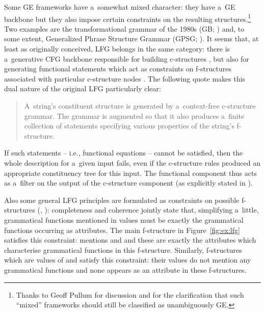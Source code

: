 \documentclass[output=paper,hidelinks]{langscibook}
\begin{document}
Some GE frameworks have a~somewhat mixed character: they have a~GE backbone but they also impose certain constraints on the resulting structures.\footnote{Thanks to Geoff Pullum for discussion and for the clarification that such “mixed” frameworks should still be classified as unambiguously GE\@.}  Two examples are the transformational grammar of the 1980s (GB; \citealt{chomsky1981lectures,Chomsky86b}) and, to some extent, Generalized Phrase Structure Grammar (GPSG; \citealt{gkps}).  It seems that, at least as originally conceived, LFG belongs in the same category: there is a~generative CFG backbone responsible for building c-structures \citep[175]{kaplanbresnan82}, but also for generating functional statements which act as constraints on f-structures associated with particular c-structure nodes \citep[181]{kaplanbresnan82}.  The following quote makes this dual nature of the original LFG particularly clear:
\begin{quote}
  A~string's constituent structure is generated by a~context-free c-structure grammar.  The grammar is augmented so that it also produces a~finite collection of statements specifying various properties of the string's f-structure. \\\hspace*{\fill}\citep[180--181]{kaplanbresnan82}
\end{quote}
If such statements -- i.e., functional equations -- cannot be satisfied, then the whole description for a~given input fails, even if the c-structure rules produced an appropriate constituency tree for this input.  The functional component thus acts as a~filter on the output of the c-structure component (as explicitly stated in \citealt[203--204]{kaplanbresnan82}).

Also some general LFG principles are formulated as constraints on possible f-structures (\citealt[178--179]{kaplanbresnan82}, \citealt[Section {2.4.6}]{DLM:LFG}): completeness and coherence jointly state that, simplifying a~little, grammatical functions mentioned in \PRED values must be exactly the grammatical functions occurring as attributes.  The main f-structure in Figure~\ref{fig:ex:lfg} satisfies this constraint: \PRED mentions \SUBJ and \OBJ and these are exactly the attributes which characterise grammatical functions in this f-structure.  Similarly, f-structures which are values of \SUBJ and \OBJ satisfy this constraint: their \PRED values do not mention any grammatical functions and none appears as an attribute in these f-structures.  
\end{document}
